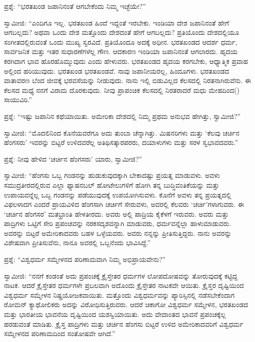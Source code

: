  ಪ್ರಶ್ನೆ: “ಭರತಖಂಡ ಜಪಾನಿನಂತೆ ಆಗಬೇಕೆಂದು ನಿಮ್ಮ ಇಚ್ಛೆಯೇ?” 

 ಸ್ವಾಮೀಜಿ: “ಎಂದಿಗೂ ಇಲ್ಲ. ಭರತಖಂಡ ಹಿಂದೆ ಇದ್ದಂತೆ ಇರಬೇಕು. ಇಂಡಿಯಾ ದೇಶ ಜಪಾನಿನಂತೆ ಹೇಗೆ ಆಗಬಲ್ಲದು? ಅಥವಾ ಒಂದು ದೇಶ ಮತ್ತೊಂದು ದೇಶದಂತೆ ಹೇಗೆ ಆಗಬಲ್ಲದು? ಪ್ರತಿಯೊಂದು ದೇಶದಲ್ಲಿಯೂ ಸಂಗೀತದಲ್ಲಿರುವಂತೆ ಒಂದು ಮುಖ್ಯ ಸ್ವರವಿದೆ. ಪ್ರತಿಯೊಂದೂ ಅದಕ್ಕೆ ಅಧೀನ. ಭರತಖಂಡದ ಆದರ್ಶ ಧರ್ಮ, ಸಾರ್ವಜನಿಕ ಮತ್ತು ಇತರ ಸುಧಾರಣೆಗಳೆಲ್ಲ ಗೌಣ. ಆದಕಾರಣ ಇಂಡಿಯಾ ಜಪಾನಿನಂತೆ ಆಗಲಾರದು. ಹೃದಯ ಕರಗಿದಾಗ ಭಾವ ಹೊರಹೊಮ್ಮುವುದು ಎಂದು ಹೇಳುವರು. ಭರತಖಂಡದ ಹೃದಯ ಕರಗಬೇಕು, ಆಧ್ಯಾತ್ಮಿಕ ಪ್ರವಾಹ ಅಲ್ಲಿಂದ ಹರಿಯುವುದು. ಭರತಖಂಡ ಭರತಖಂಡವೆ. ನಾವು ಜಪಾನೀಯರಲ್ಲ, ಹಿಂದೂಗಳು. ಭರತಖಂಡದ ವಾತಾವರಣ ಬೆಂದ ಜೀವಕ್ಕೆ ಭರವಸೆಯನ್ನು ನೀಡುವುದು. ನಾನು ಇಲ್ಲಿ ಬಿಡುವಿಲ್ಲದ ಕೆಲಸದಲ್ಲಿ ನಿರತನಾಗಿರುವೆನು. ಈ ಕೆಲಸದ ಮಧ್ಯೆ ನನಗೆ ವಿರಾಮ ದೊರಕುವುದು. ನೀವು ಪ್ರಾಪಂಚಿಕ ಕೆಲಸದಲ್ಲಿ ನಿರತರಾದರೆ ಮಧು ಮೇಹದಿಂದ\break () ಸಾಯುವಿರಿ.” 

 ಪ್ರಶ್ನೆ: “ಇಷ್ಟು ಜಪಾನಿನ ಕಥೆಯಾಯಿತು. ಅಮೇರಿಕಾ ದೇಶದಲ್ಲಿ ನಿಮ್ಮ ಪ್ರಥಮ ಅನುಭವ ಹೇಗಿತ್ತು, ಸ್ವಾಮೀಜಿ?” 

 ಸ್ವಾಮೀಜಿ: “ಮೊದಲಿನಿಂದ ಕೊನೆಯವರೆಗೂ ಅದು ತುಂಬಾ ಚೆನ್ನಾಗಿತ್ತು. ಮಿಷನರಿಗಳು ಮತ್ತು ‘ಕೆಲವು ಚರ್ಚಿನ ಹೆಂಗಸರು’ ಇವರನ್ನು ಬಿಟ್ಟರೆ ಉಳಿದವರೆಲ್ಲ ಅತಿಥಿಸತ್ಕಾರಪರರು, ದಯಾಳುಗಳು ಮತ್ತು ಸರಳ ಸ್ವಭಾವದವರು.” 

 ಪ್ರಶ್ನೆ: ನೀವು ಹೇಳಿದ ‘ಚರ್ಚಿನ ಹೆಂಗಸರು’ ಯಾರು, ಸ್ವಾಮೀಜಿ?” 

 ಸ್ವಾಮೀಜಿ: “ಹೆಂಗಸು ಒಬ್ಬ ಗಂಡನನ್ನು ಹುಡುಕುವುದಕ್ಕಾಗಿ ಬೇಕಾದಷ್ಟು ಪ್ರಯತ್ನ ಮಾಡುವಳು. ಅವಳು ಸಮುದ್ರತೀರದಲ್ಲಿರುವ ಎಲ್ಲಾ ಫ್ಯಾಷನಬಲ್ ಹೋಟೇಲುಗಳಿಗೆ ಹೋಗಿ ತನ್ನ ಬುದ್ಧಿವಂತಿಕೆಯನ್ನು ಮತ್ತು ಉಪಾಯವನ್ನೆಲ್ಲ ಒಬ್ಬ ಗಂಡನನ್ನು ಪಡೆಯುವುದಕ್ಕೆ ಉಪಯೋಗಿಸುವಳು. ಕೊನೆಗೆ ಅವಳು ತನ್ನ ಪ್ರಯತ್ನದಲ್ಲಿ ವಿಫಲಳಾದಗ  ಎಂದರೆ ಪ್ರಾಯವಿಳಿದ ಹೆಂಗಸಾಗಿ ಚರ್ಚಿಗೆ ಸೇರುವಳು, ಅವರಲ್ಲಿ ಕೆಲವರು ‘ಚರ್ಚಿ’ಗಳಾಗುವರು. ಈ ‘ಚರ್ಚಿನ ಹೆಂಗಸರ’ ಮತಭ್ರಾಂತಿ ಹೇಳತೀರದು. ಅವರು ಅಲ್ಲಿ ಪಾದ್ರಿಯ ಕೈಕೆಳಗೆ ಇರುವರು. ಅವರು ಮತ್ತು ಪಾದ್ರಿಗಳು ಒಟ್ಟಿಗೆ ಸೇರಿ ಪ್ರಪಂಚವನ್ನು ನರಕಸದೃಶವನ್ನಾಗಿ ಮಾಡುವರು, ಧರ್ಮವನ್ನೆಲ್ಲಾ ಹಾಳುಮಾಡುವರು. ಅವರನ್ನು ಬಿಟ್ಟರೆ ಅಮೇರಿಕಾದವರು ಬಹಳ ಒಳ್ಳೆಯವರು. ಅವರು ನನ್ನನ್ನು ಪ್ರೀತಿಸುತ್ತಿದ್ದರು. ನಾನು ಅವರನ್ನು ವಿಶೇಷವಾಗಿ ಪ್ರೀತಿಸುವೆನು, ನಾನೂ ಅವರಲ್ಲಿ ಒಬ್ಬನೆಂದು ಭಾವಿಸಿದ್ದೆ.” 

 ಪ್ರಶ್ನೆ: “ವಿಶ್ವಧರ್ಮ ಸಮ್ಮೇಳನದ ಪರಿಣಾಮವಾಗಿ ನಿಮ್ಮ ಅಭಿಪ್ರಾಯವೇನು?” 

 ಸ್ವಾಮೀಜಿ: “ನನಗೆ ಕಂಡಂತೆ ಅದು ಪ್ರಪಂಚಕ್ಕೆ ಕ್ರೈಸ್ತೇತರ ಧರ್ಮಗಳ ಲೋಪದೋಷವನ್ನು ತೋರುವುದಕ್ಕೆ ಕಟ್ಟಿದ್ದ ನಾಟಕ. ಆದರೆ ಕ್ರೈಸ್ತೇತರ ಧರ್ಮಗಳೇ ಪ್ರಬಲವಾಗಿ ಅದೊಂದು ಕ್ರೈಸ್ತೇತರ ನಾಟಕವೇ ಆಯಿತು. ಕ್ರೈಸ್ತರ ದೃಷ್ಟಿಯಿಂದ ವಿಶ್ವಧರ್ಮ ಸಮ್ಮೇಳನ ನಿಷ್ಪ್ರಯೋಜಕವಾಯಿತು. ಮತ್ತೊಂದು ವಿಶ್ವಧರ್ಮವನ್ನು ಪ್ಯಾರಿಸ್ಸಿನಲ್ಲಿ ನಡೆಸಬೇಕೆಂದಾಗ ರೋಮನ್ ಕ್ಯಾಥೋಲಿಕರು ಅದನ್ನು ವಿರೋಧಿಸುತ್ತಿರುವರು. ಆದರೆ ಚಿಕಾಗೋ ವಿಶ್ವಧರ್ಮ ಸಮ್ಮೇಳನ, ಭರತಖಂಡದ ಮತ್ತು ಭಾರತೀಯ ಭಾವನೆಯ ದೃಷ್ಟಿಯಿಂದ ಯಶಸ್ವಿಯಾಯಿತು. ಅದು ವೇದಾಂತದ ಭಾವನೆ ಪ್ರಪಂಚಕ್ಕೆಲ್ಲ ಹರಡುವಂತೆ ಮಾಡಿತು. ಕ್ರೈಸ್ತ ಪಾದ್ರಿಗಳು ಮತ್ತು ಚರ್ಚಿನ ಹೆಂಗಸು ಬಿಟ್ಟರೆ ಉಳಿದ ಅಮೇರಿಕಾದವರಿಗೆ ವಿಶ್ವಧರ್ಮ ಸಮ್ಮೇಳನದ ಪರಿಣಾಮದಿಂದ ಸಂತೋಷವೇ ಆಗಿದೆ.” 

